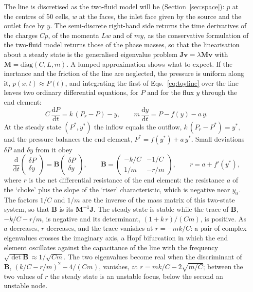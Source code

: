\documentclass[a4paper,fleqn]{cas-sc}
\newcommand{\dd}{\mathrm{d}}
\newcommand{\bJ}{\mathbf{J}}
\newcommand{\bM}{\mathbf{M}}
\newcommand{\bv}{\mathbf{v}}
\begin{document}
The line is discretised as the two-fluid model will be (Section~\ref{sec:space}): $p$ at the centres of 50 cells, $w$ at the faces, the inlet face given by the source and the outlet face by $y$. The semi-discrete right-hand side returns the time derivatives of the charges $C p$, of the momenta $L w$ and of $m y$, as the conservative formulation of the two-fluid model returns those of the phase masses, so that the linearisation about a steady state is the generalised eigenvalue problem $\bJ\bv = \lambda\bM\bv$ with $\bM = \mathrm{diag}(C, L, m)$. A lumped approximation shows what to expect. If the inertance and the friction of the line are neglected, the pressure is uniform along it, $p(x,t) \approx P(t)$, and integrating the first of Eqs.~\eqref{eq:toyline} over the line leaves two ordinary differential equations, for $P$ and for the flux $y$ through the end element:
\begin{equation}\label{eq:toylumpedode}
C\,\frac{\dd P}{\dd t} = k\,(P_r - P) - y, \qquad m\,\frac{\dd y}{\dd t} = P - f(y) - a\,y .
\end{equation}
At the steady state $(P^*, y^*)$ the inflow equals the outflow, $k\,(P_r - P^*) = y^*$, and the pressure balances the end element, $P^* = f(y^*) + a\,y^*$. Small deviations $\delta P$ and $\delta y$ from it obey
\begin{equation}\label{eq:toylumped}
\frac{\dd}{\dd t}\begin{pmatrix}\delta P \\ \delta y\end{pmatrix} = \mathbf{B}\begin{pmatrix}\delta P \\ \delta y\end{pmatrix}, \qquad
\mathbf{B} = \begin{pmatrix} -k/C & -1/C \\ 1/m & -r/m \end{pmatrix}, \qquad r = a + f'(y^*),
\end{equation}
where $r$ is the net differential resistance of the end element: the resistance $a$ of the `choke' plus the slope of the `riser' characteristic, which is negative near $y_0$. The factors $1/C$ and $1/m$ are the inverse of the mass matrix of this two-state system, so that $\mathbf{B}$ is its $\bM^{-1}\bJ$. The steady state is stable while the trace of $\mathbf{B}$, $-k/C - r/m$, is negative and its determinant, $(1 + k\,r)/(Cm)$, is positive. As $a$ decreases, $r$ decreases, and the trace vanishes at $r = -mk/C$: a pair of complex eigenvalues crosses the imaginary axis, a Hopf bifurcation in which the end element oscillates against the capacitance of the line with the frequency $\sqrt{\det\mathbf{B}} \approx 1/\sqrt{Cm}$. The two eigenvalues become real when the discriminant of $\mathbf{B}$, $(k/C - r/m)^2 - 4/(Cm)$, vanishes, at $r = mk/C - 2\sqrt{m/C}$; between the two values of $r$ the steady state is an unstable focus, below the second an unstable node.
\end{document}
